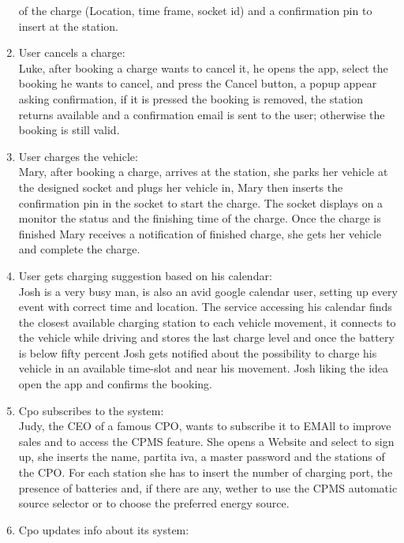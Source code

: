 \begin{enumerate}[label=\textbf{S\arabic*}]
            of the charge (Location, time frame, socket id) and a confirmation pin to insert at the station.
      \item User cancels a charge:\\
            Luke, after booking a charge wants to cancel it, he opens the app, select the booking he wants to cancel,
            and press the Cancel button, a popup appear asking confirmation, if it is pressed the booking is removed,
            the station returns available and a confirmation email is sent to the user; otherwise the booking is still valid.
      \item User charges the vehicle:\\
            Mary, after booking a charge, arrives at the station, she parks her vehicle at the designed socket
            and plugs her vehicle in, Mary then inserts the confirmation pin in the socket to start the charge.
            The socket displays on a monitor the status and the finishing time of the charge.
            Once the charge is finished Mary receives a notification of finished charge,
            she gets her vehicle and complete the charge.
      \item User gets charging suggestion based on his calendar:\\
            Josh is a very busy man, is also an avid google calendar user,
            setting up every event with correct time and location.
            The service accessing his calendar finds the closest available charging station to each vehicle movement,
            it connects to the vehicle while driving and stores the last charge level and once the battery is below fifty percent Josh gets notified
            about the possibility to charge his vehicle in an available time-slot and near his movement.
            Josh liking the idea open the app and confirms the booking.
      \item Cpo subscribes to the system:\\
            Judy, the CEO of a famous CPO, wants to subscribe it to EMAll to improve sales and to access the CPMS feature.
            She opens a Website and select to sign up, she inserts the name, partita iva, a master password and the stations of the CPO.
            For each station she has to insert the number of charging port, the presence of batteries and, if there are any,
            wether to use the CPMS automatic source selector or to choose the preferred energy source.
      \item Cpo updates info about its system:\\

\end{enumerate}

